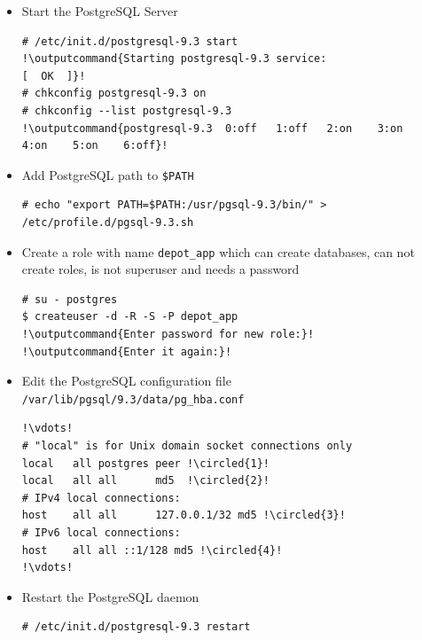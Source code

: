 \documentclass{beamer}
\newcommand*\circled[1]{\tikz[baseline=(char.base)]{
            \node[shape=circle,draw,inner sep=2pt] (char) {#1};}}
\newcommand{\outputcommand}[1]{\color{darkgreen}{#1}}
\begin{document}
\begin{frame}
\begin{itemize}
\lstset{language=shell, escapechar=!}Finally \dots
\begin{lstlisting}[escapechar=!]
# ls /var/lib/pgsql/9.3/data/*
!\outputcommand{A lot of stuff}!
\end{lstlisting}

\item Start the PostgreSQL Server

\lstset{language=shell, escapechar=!}
\begin{lstlisting}[escapechar=!]
# /etc/init.d/postgresql-9.3 start
!\outputcommand{Starting postgresql-9.3 service:                           [  OK  ]}!
# chkconfig postgresql-9.3 on
# chkconfig --list postgresql-9.3
!\outputcommand{postgresql-9.3 	0:off	1:off	2:on	3:on	4:on	5:on	6:off}!
\end{lstlisting}

\item Add PostgreSQL path to \texttt{\$PATH}

\lstset{language=shell, escapechar=!}
\begin{lstlisting}[escapechar=!]
# echo "export PATH=$PATH:/usr/pgsql-9.3/bin/" > /etc/profile.d/pgsql-9.3.sh
\end{lstlisting}

\item Create a role with name \texttt{depot\_app} which can create databases, can not create roles, is not superuser and needs a password

\lstset{language=shell, escapechar=!}
\begin{lstlisting}[escapechar=!]
# su - postgres
$ createuser -d -R -S -P depot_app
!\outputcommand{Enter password for new role:}!
!\outputcommand{Enter it again:}!
\end{lstlisting}

\item Edit the PostgreSQL configuration file \texttt{/var/lib/pgsql/9.3/data/pg\_hba.conf}

\lstset{language=shell, escapechar=!, numbers=left}
\begin{lstlisting}[escapechar=!]
!\vdots!
# "local" is for Unix domain socket connections only
local   all postgres peer !\circled{1}!
local   all all      md5  !\circled{2}!
# IPv4 local connections:
host    all all      127.0.0.1/32 md5 !\circled{3}!
# IPv6 local connections:
host    all all ::1/128 md5 !\circled{4}!
!\vdots!
\end{lstlisting}

\item Restart the PostgreSQL daemon

\lstset{language=shell, escapechar=!}
\begin{lstlisting}[escapechar=!]
# /etc/init.d/postgresql-9.3 restart
\end{lstlisting}

\end{itemize}
\end{frame}
\end{document}
